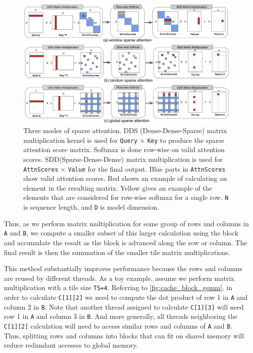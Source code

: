 \documentclass[11pt]{article}
\begin{document}
\begin{figure}[t]
  \centering
  \includegraphics[width=\linewidth]{figures/sparse_attn.png}
  \caption{Three modes of sparse attention. DDS (Dense-Dense-Sparse) matrix multiplication kernel is used for \texttt{Query} $\times$ \texttt{Key} to produce the sparse attention score matrix. Softmax is done row-wise on valid attention scores. SDD(Sparse-Dense-Dense) matrix multiplication is used for \texttt{AttnScores} $\times$ \texttt{Value} for the final output. Blue parts in \texttt{AttnScores} show valid attention scores. Red shows an example of calculating an element in the resulting matrix. Yellow gives an example of the elements that are considered for row-wise softmax for a single row. \texttt{N} is sequence length, and \texttt{D} is model dimension.}
 \label{fig:sparse_attn}
\end{figure}

Thus, as we perform matrix multiplication for some group of rows and columns in \texttt{A} and \texttt{B}, we compute a smaller subset of this larger calculation using the block and accumulate the result as the block is advanced along the row or column. The final result is then the summation of the smaller tile matrix multiplications. 

This method substantially improves performance because the rows and columns are reused by different threads. As a toy example, assume we perform matrix multiplication with a tile size \texttt{TS=4}. Referring to \autoref{fig:cache_block_gemm}, in order to calculate \texttt{C[1][2]} we need to compute the dot product of row 1 in \texttt{A} and column 2 in \texttt{B}. Note that another thread assigned to calculate \texttt{C[1][3]} will need row 1 in \texttt{A} and column 3 in \texttt{B}. And more generally, all threads neighboring the \texttt{C[1][2]} calculation will need to access similar rows and columns of \texttt{A} and \texttt{B}. Thus, splitting rows and columns into blocks that can fit on shared memory will reduce redundant accesses to global memory. 
\end{document}
